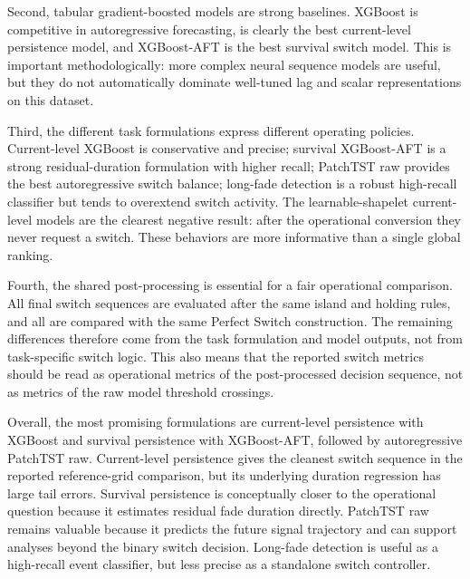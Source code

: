Second, tabular gradient-boosted models are strong baselines. XGBoost is
competitive in autoregressive forecasting, is clearly the best current-level
persistence model, and XGBoost-AFT is the best survival switch model. This is
important methodologically: more complex neural sequence models are useful, but
they do not automatically dominate well-tuned lag and scalar representations on
this dataset.

Third, the different task formulations express different operating policies.
Current-level XGBoost is conservative and precise; survival XGBoost-AFT is a
strong residual-duration formulation with higher recall; PatchTST raw provides
the best autoregressive switch balance; long-fade detection is a robust
high-recall classifier but tends to overextend switch activity. The
learnable-shapelet current-level models are the clearest negative result: after
the operational conversion they never request a switch. These behaviors are
more informative than a single global ranking.

Fourth, the shared post-processing is essential for a fair operational
comparison. All final switch sequences are evaluated after the same island and
holding rules, and all are compared with the same Perfect Switch construction.
The remaining differences therefore come from the task formulation and model
outputs, not from task-specific switch logic. This also means that the reported
switch metrics should be read as operational metrics of the post-processed
decision sequence, not as metrics of the raw model threshold crossings.

Overall, the most promising formulations are current-level persistence with
XGBoost and survival persistence with XGBoost-AFT, followed by autoregressive
PatchTST raw. Current-level persistence gives the cleanest switch sequence in
the reported reference-grid comparison, but its underlying duration regression
has large tail errors. Survival persistence is conceptually closer to the
operational question because it estimates residual fade duration directly.
PatchTST raw remains valuable because it predicts the future signal trajectory
and can support analyses beyond the binary switch decision. Long-fade detection
is useful as a high-recall event classifier, but less precise as a standalone
switch controller.
